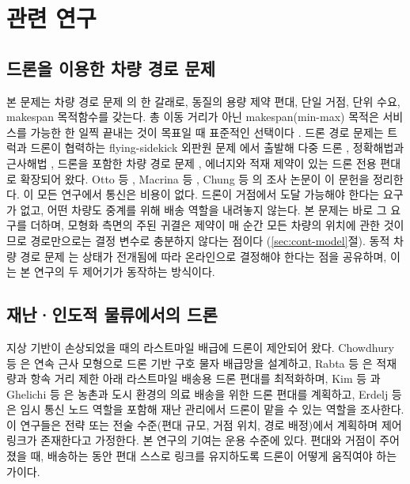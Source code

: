 \documentclass[final,5p,times,twocolumn]{elsarticle}
\begin{document}
\section{관련 연구}
\label{sec:related}

\subsection{드론을 이용한 차량 경로 문제}
\label{sec:rel-vrp}
본 문제는 차량 경로 문제 \cite{dantzig1959,toth2014}의 한 갈래로, 동질의 용량 제약 편대, 단일
거점, 단위 수요, makespan 목적함수를 갖는다. 총 이동 거리가 아닌 makespan(min-max) 목적은
서비스를 가능한 한 일찍 끝내는 것이 목표일 때 표준적인 선택이다 \cite{park2023,kitjacharoenchai2019}.
드론 경로 문제는 트럭과 드론이 협력하는 flying-sidekick 외판원 문제 \cite{murray2015}에서 출발해
다중 드론 \cite{murray2020}, 정확해법과 근사해법 \cite{agatz2018,ha2018,roberti2021,dell2021},
드론을 포함한 차량 경로 문제 \cite{poikonen2017,sacramento2019,schermer2019}, 에너지와 적재 제약이
있는 드론 전용 편대 \cite{dorling2017}로 확장되어 왔다. Otto 등 \cite{otto2018}, Macrina 등
\cite{macrina2020}, Chung 등 \cite{chung2020}의 조사 논문이 이 문헌을 정리한다. 이 모든 연구에서
통신은 비용이 없다. 드론이 거점에서 도달 가능해야 한다는 요구가 없고, 어떤 차량도 중계를 위해
배송 역할을 내려놓지 않는다. 본 문제는 바로 그 요구를 더하며, 모형화 측면의 주된 귀결은 제약이 매
순간 모든 차량의 위치에 관한 것이므로 경로만으로는 결정 변수로 충분하지 않다는 점이다
(\ref{sec:cont-model}절). 동적 차량 경로 문제 \cite{pillac2013}는 상태가 전개됨에 따라
온라인으로 결정해야 한다는 점을 공유하며, 이는 본 연구의 두 제어기가 동작하는 방식이다.

\subsection{재난·인도적 물류에서의 드론}
\label{sec:rel-disaster}
지상 기반이 손상되었을 때의 라스트마일 배급에 드론이 제안되어 왔다. Chowdhury 등
\cite{chowdhury2017}은 연속 근사 모형으로 드론 기반 구호 물자 배급망을 설계하고, Rabta 등
\cite{rabta2018}은 적재량과 항속 거리 제한 아래 라스트마일 배송용 드론 편대를 최적화하며, Kim 등
\cite{kim2017}과 Ghelichi 등 \cite{ghelichi2021}은 농촌과 도시 환경의 의료 배송을 위한 드론
편대를 계획하고, Erdelj 등 \cite{erdelj2017}은 임시 통신 노드 역할을 포함해 재난 관리에서 드론이
맡을 수 있는 역할을 조사한다. 이 연구들은 전략 또는 전술 수준(편대 규모, 거점 위치, 경로 배정)에서
계획하며 제어 링크가 존재한다고 가정한다. 본 연구의 기여는 운용 수준에 있다. 편대와 거점이
주어졌을 때, 배송하는 동안 편대 스스로 링크를 유지하도록 드론이 어떻게 움직여야 하는가이다.
\end{document}
